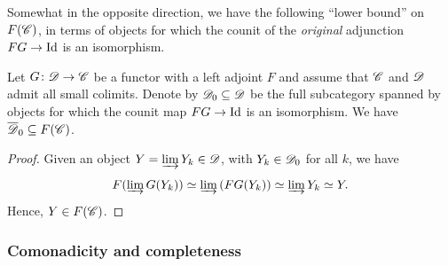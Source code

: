 \documentclass[12pt]{article}
\begin{document}
Somewhat in the opposite direction, we have the following ``lower bound'' on $F(\mathscr{C})$, in terms of objects for which the counit of the \textit{original} adjunction $F G \to \mathrm{Id}$ is an isomorphism. 

\begin{prop}\label{Cmpl2Free}
    Let $G\colon \mathscr{D} \to \mathscr{C}$ be a functor with a left adjoint $F$ and assume that $\mathscr{C}$ and $\mathscr{D}$ admit all small colimits. Denote by $\mathscr{D}_0\subseteq \mathscr{D}$ be the full subcategory spanned by objects for which the counit map $F G \to \mathrm{Id}$ is an isomorphism. We have 
    $\overline{\mathscr{D}}_0 \subseteq F(\mathscr{C})$. 
\end{prop}
\begin{proof}
    Given an object $Y=\underrightarrow{\operatorname{lim}}\, Y_k \in \mathscr{D}$, with $Y_k \in \mathscr{D}_0$ for all $k$, we have 
    \[
        F(\underrightarrow{\operatorname{lim}}\, G (Y_k)) \simeq 
        \underrightarrow{\operatorname{lim}}\,(F G (Y_k)) \simeq
        \underrightarrow{\operatorname{lim}}\, Y_k \simeq Y.
    \]
    Hence, $Y \in F(\mathscr{C})$. 
\end{proof}

\subsubsection{Comonadicity and completeness}
\end{document}
